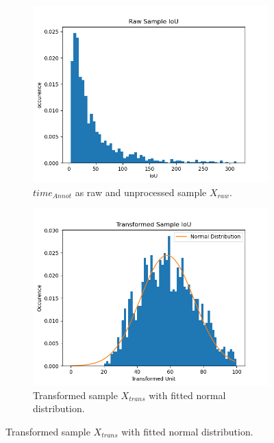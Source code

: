 \begin{figure} [h]
	\centering
	\begin{subfigure}[t]{0.3\textwidth}
		\centering
		\includegraphics[width=\textwidth]{figures/chap51_time_raw.png}
		\caption{
			$ time_{Annot} $ as raw and unprocessed sample $ X_{raw} $.
		}\label{fig:ch5:sec1:time_raw}
	\end{subfigure}
	\hfill
	\begin{subfigure}[t]{0.3\textwidth}
		\centering
		\includegraphics[width=\textwidth]{figures/chap51_time_trans.png}
		\caption{
			Transformed sample $X_{trans}$ with fitted normal distribution.
		} \label{fig:ch5:sec1:time_transformed}
	\end{subfigure}

\end{figure}
